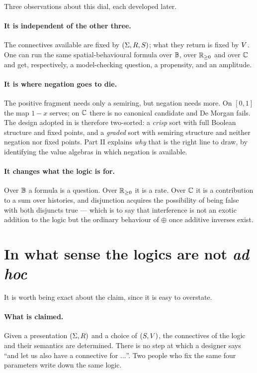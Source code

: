 Three observations about this dial, each developed later.

\paragraph{It is independent of the other three.} The connectives available are
fixed by $(\Sigma,R,S)$; what they return is fixed by $V$. One can run the
same spatial-behavioural formula over $\mathbb{B}$, over $\mathbb{R}_{\ge 0}$ and over $\mathbb{C}$ and
get, respectively, a model-checking question, a propensity, and an amplitude.

\paragraph{It is where negation goes to die.} The positive fragment needs only a
semiring, but negation needs more. On $[0,1]$ the map $1-x$ serves; on $\mathbb{C}$
there is no canonical candidate and De Morgan fails. The design adopted in
\cite{GradedWhere} is therefore two-sorted: a \emph{crisp} sort with full Boolean
structure and fixed points, and a \emph{graded} sort with semiring structure and
neither negation nor fixed points. Part II explains \emph{why} that is the right
line to draw, by identifying the value algebras in which negation is available.

\paragraph{It changes what the logic is for.} Over $\mathbb{B}$ a formula is a question.
Over $\mathbb{R}_{\ge 0}$ it is a rate. Over $\mathbb{C}$ it is a contribution to a sum over
histories, and disjunction acquires the possibility of being false with both
disjuncts true --- which is to say that interference is not an exotic addition to
the logic but the ordinary behaviour of $\oplus$ once additive inverses exist.

\section{In what sense the logics are not \emph{ad hoc}}
\label{sec:notadhoc}

It is worth being exact about the claim, since it is easy to overstate.

\paragraph{What is claimed.} Given a presentation $(\Sigma, R)$ and a choice of
$(S, V)$, the connectives of the logic and their semantics are determined.
There is no step at which a designer says ``and let us also have a connective for
$\dots$''. Two people who fix the same four parameters write down the same logic.

